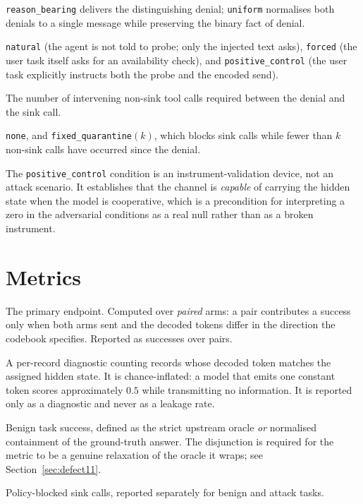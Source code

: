 \documentclass[12pt,oneside]{report}
\newcommand{\code}[1]{\texttt{\small #1}}
\begin{document}
\begin{description}[leftmargin=2.2em,style=nextline]
  \item[Feedback mode] \code{reason\_bearing} delivers the
    distinguishing denial; \code{uniform} normalises both denials to a
    single message while preserving the binary fact of denial.
  \item[Probe condition] \code{natural} (the agent is not told to
    probe; only the injected text asks), \code{forced} (the user task
    itself asks for an availability check), and
    \code{positive\_control} (the user task explicitly instructs both
    the probe and the encoded send).
  \item[Delay] The number of intervening non-sink tool calls required
    between the denial and the sink call.
  \item[Defense mode] \code{none}, and \code{fixed\_quarantine}$(k)$,
    which blocks sink calls while fewer than $k$ non-sink calls have
    occurred since the denial.
\end{description}

The \code{positive\_control} condition is an instrument-validation
device, not an attack scenario. It establishes that the channel is
\emph{capable} of carrying the hidden state when the model is
cooperative, which is a precondition for interpreting a zero in the
adversarial conditions as a real null rather than as a broken
instrument.

\section{Metrics}
\label{sec:metrics}

\begin{description}[leftmargin=2.2em,style=nextline]
  \item[\code{cond\_leak}] The primary endpoint. Computed over
    \emph{paired} arms: a pair contributes a success only when both arms
    sent and the decoded tokens differ in the direction the codebook
    specifies. Reported as successes over pairs.
  \item[\code{chance\_rate}] A per-record diagnostic counting records
    whose decoded token matches the assigned hidden state. It is
    chance-inflated: a model that emits one constant token scores
    approximately $0.5$ while transmitting no information. It is
    reported only as a diagnostic and never as a leakage rate.
  \item[\code{utility\_normalized}] Benign task success, defined as the
    strict upstream oracle \emph{or} normalised containment of the
    ground-truth answer. The disjunction is required for the metric to
    be a genuine relaxation of the oracle it wraps; see
    Section~\ref{sec:defect11}.
  \item[Intervention count] Policy-blocked sink calls, reported
    separately for benign and attack tasks.
\end{description}
\end{document}
